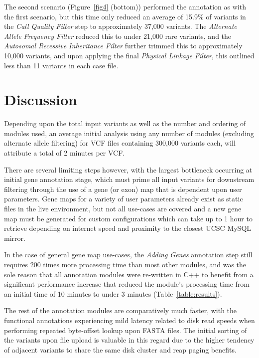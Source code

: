 \documentclass[twocolumn]{bmcart}%
\begin{document}
The second scenario (Figure~\ref{fig4} (bottom)) performed the annotation as with the first scenario, but this time only reduced an average of 15.9\% of variants in the \textit{Call Quality Filter} step to approximately 37,000 variants. The \textit{Alternate Allele Frequency Filter} reduced this to under 21,000 rare variants, and the \textit{Autosomal Recessive Inheritance Filter} further trimmed this to approximately 10,000 variants, and upon applying the final \textit{Physical Linkage Filter}, this outlined less than 11 variants in each case file.



\section*{Discussion}

Depending upon the total input variants as well as the number and ordering of modules used, an average initial analysis using any number of modules (excluding alternate allele filtering) for VCF files containing 300,000 variants each, will attribute a total of 2 minutes per VCF.

There are several limiting steps however, with the largest bottleneck occurring at initial gene annotation stage, which must prime all input variants for downstream filtering through the use of a gene (or exon) map that is dependent upon user parameters. Gene maps for a variety of user parameters already exist as static files in the live environment, but not all use-cases are covered and a new gene map must be generated for custom configurations which can take up to 1 hour to retrieve depending on internet speed and proximity to the closest UCSC MySQL mirror.

In the case of general gene map use-cases, the \textit{Adding Genes} annotation step still requires 200 times more processing time than most other modules, and was the sole reason that all annotation modules were re-written in C++ to benefit from a significant performance increase that reduced the module's processing time from an initial time of 10 minutes to under 3 minutes (Table~\ref{table:results}). 

The rest of the annotation modules are comparatively much faster, with the functional annotations experiencing mild latency related to disk read speeds when performing repeated byte-offset lookup upon FASTA files. The initial sorting of the variants upon file upload is valuable in this regard due to the higher tendency of adjacent variants to share the same disk cluster and reap paging benefits.
\end{document}
